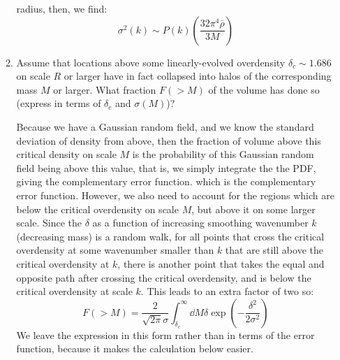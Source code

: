 \begin{enumerate}
\begin{enumerate}
\begin{answer}
radius, then, we find:
\begin{equation}
    \sigma^2(k) \sim P(k)
    \left(\frac{32\pi^4\bar{\rho}}{3M}\right)
\end{equation}
\end{answer}
\item Assume that locations above some linearly-evolved
overdensity $\delta_c \sim 1.686$ on scale $R$ or larger have in fact
collapsed into halos of the corresponding mass $M$ or larger. What
fraction $F(>M)$ of the volume has done so (express in terms of $\delta_c$ and
$\sigma(M)$)?
\begin{answer}
    Because we have a Gaussian random field, and we know the standard
    deviation of density from above, then the fraction of volume above
    this critical density on scale $M$ is the probability of this
    Gaussian random field being above this value, that is, we simply
    integrate the the PDF, giving the complementary error function.
    which is the complementary error function. However, we also need
    to account for the regions which are below the critical overdensity on
    scale $M$, but above it on some larger scale. Since the $\delta$
    as a function of increasing smoothing wavenumber $k$ (decreasing
    mass) is a random walk, for all points that cross the critical
    overdensity at some wavenumber smaller than $k$ that are still above
    the critical overdensity at $k$, there is another point that takes the
    equal and opposite path after crossing the critical overdensity, and
    is below the critical overdensity at scale $k$. This leads to an
    extra factor of two so:
    \begin{equation}
        F(>M)
    = \frac{2}{\sqrt{2\pi}\sigma}\int^\infty_{\delta_c}\dd{M} \delta \exp\left(-\frac{\delta^2}{2\sigma^2}\right)
    \end{equation}
    We leave the expression in this form rather than in terms of the
    error function, because it makes the calculation below easier.
\end{answer}


\end{enumerate}
\end{enumerate}
